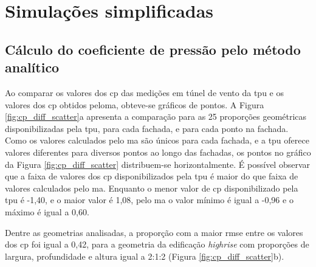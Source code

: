 \documentclass[brazil,hardcopy,openany]{ufscthesis} %
\begin{document}
\section{Simulações simplificadas}

\subsection{Cálculo do coeficiente de pressão pelo método analítico}

Ao comparar os valores dos \acrfull{cp} das medições em túnel de vento da \acrfull{tpu} e os valores dos \acrshort{cp} obtidos pelo\acrlong{ma}, obteve-se gráficos de pontos. 
A Figura \ref{fig:cp_diff_scatter}a apresenta a comparação para as 25 proporções geométricas disponibilizadas pela \acrshort{tpu}, para cada fachada, e para cada ponto na fachada.
Como os valores calculados pelo \acrlong{ma} são únicos para cada fachada, e a \acrshort{tpu} oferece valores diferentes para diversos pontos ao longo das fachadas, os pontos no gráfico da Figura \ref{fig:cp_diff_scatter} distribuem-se horizontalmente. 
É possível observar que a faixa de valores dos \acrshort{cp} disponibilizados pela \acrshort{tpu} é maior do que  faixa de valores calculados pelo \acrlong{ma}. Enquanto o menor valor de \acrshort{cp} disponibilizado pela \acrshort{tpu} é \mbox{-1,40}, e o maior valor é 1,08, pelo \acrlong{ma} o valor mínimo é igual a -0,96 e o máximo é igual a 0,60.

Dentre as geometrias analisadas, a proporção com a maior \acrfull{rmse} entre os valores dos \acrshort{cp} foi igual a 0,42, para a geometria da edificação \textit{highrise} com proporções de largura, profundidade e altura igual a 2:1:2 (Figura \ref{fig:cp_diff_scatter}b).

\vspace{40pt}
\newpage
\end{document}
